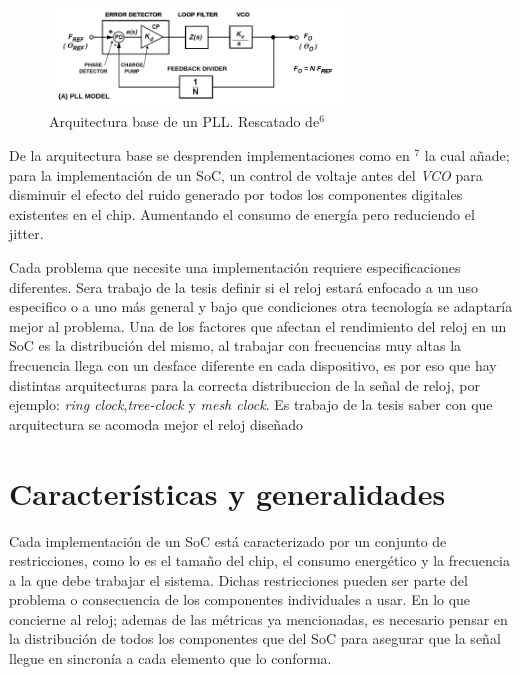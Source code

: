\documentclass[runningheads,a4paper]{llncs}
\begin{document}
\begin{figure}[t]
\includegraphics[width=8cm]{PLL.png}
\centering
\caption{Arquitectura base de un PLL. Rescatado de${}^6$}
\end{figure}

    De la arquitectura base se desprenden implementaciones como en ${}^7$ la cual añade; para la implementación de un SoC, un control de voltaje antes del \textit{VCO} para disminuir el efecto del ruido generado por todos los componentes digitales existentes en el chip. Aumentando el consumo de energía pero reduciendo el jitter.

    Cada problema que necesite una implementación requiere especificaciones diferentes. Sera trabajo de la tesis definir si el reloj estará enfocado a un uso especifico o a uno más general y bajo que condiciones otra tecnología se adaptaría mejor al problema. Una de los factores que afectan el rendimiento del reloj en un SoC es la distribución del mismo, al trabajar con frecuencias muy altas la frecuencia llega con un desface diferente en cada dispositivo, es por eso que hay distintas arquitecturas para la correcta distribuccion de la señal de reloj, por ejemplo: \textit{ring clock},\textit{tree-clock} y \textit{mesh clock}. Es trabajo de la tesis saber con que arquitectura se acomoda mejor el reloj diseñado\\


\section{Características y generalidades}

Cada implementación de un SoC está caracterizado por un conjunto de restricciones, como lo es el tamaño del chip, el consumo energético y la frecuencia a la que debe trabajar el sistema. Dichas restricciones pueden ser parte del problema o consecuencia de los componentes individuales a usar. En lo que concierne al reloj; ademas de las métricas ya mencionadas, es necesario pensar en la distribución de todos los componentes que del SoC para asegurar que la señal llegue en sincronía a cada elemento que lo conforma.\\
\end{document}
